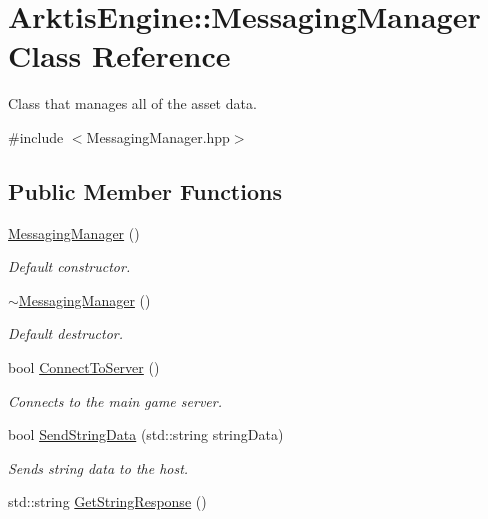 \hypertarget{class_arktis_engine_1_1_messaging_manager}{}\section{Arktis\+Engine\+::Messaging\+Manager Class Reference}
\label{class_arktis_engine_1_1_messaging_manager}


Class that manages all of the asset data.  




{\ttfamily \#include $<$Messaging\+Manager.\+hpp$>$}

\subsection*{Public Member Functions}
\begin{DoxyCompactItemize}
\item 
\mbox{\hyperlink{class_arktis_engine_1_1_messaging_manager_a2e4ad223ee19fffcab9dd3b6bc55e35a}{Messaging\+Manager}} ()
\begin{DoxyCompactList}\small\item\em Default constructor. \end{DoxyCompactList}\item 
\mbox{\hyperlink{class_arktis_engine_1_1_messaging_manager_ae5256f6a249582a27688925e34ce595d}{$\sim$\+Messaging\+Manager}} ()
\begin{DoxyCompactList}\small\item\em Default destructor. \end{DoxyCompactList}\item 
bool \mbox{\hyperlink{class_arktis_engine_1_1_messaging_manager_af87589a8b61b490eed53fbe9a4d5d637}{Connect\+To\+Server}} ()
\begin{DoxyCompactList}\small\item\em Connects to the main game server. \end{DoxyCompactList}\item 
bool \mbox{\hyperlink{class_arktis_engine_1_1_messaging_manager_a0c384955dba568c37085b2d71d77f4d7}{Send\+String\+Data}} (std\+::string string\+Data)
\begin{DoxyCompactList}\small\item\em Sends string data to the host. \end{DoxyCompactList}\item 
std\+::string \mbox{\hyperlink{class_arktis_engine_1_1_messaging_manager_a8c8d641ed44a7ffff9ac0cb128991edf}{Get\+String\+Response}} ()

\end{DoxyCompactItemize}
